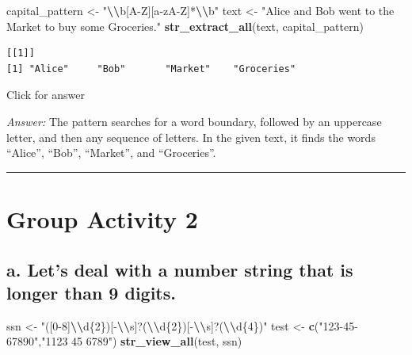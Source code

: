 \documentclass[
]{book}
\newenvironment{Shaded}{\begin{snugshade}}{\end{snugshade}}
\newcommand{\FunctionTok}[1]{\textcolor[rgb]{0.13,0.29,0.53}{\textbf{#1}}}
\newcommand{\NormalTok}[1]{#1}
\newcommand{\OtherTok}[1]{\textcolor[rgb]{0.56,0.35,0.01}{#1}}
\newcommand{\SpecialCharTok}[1]{\textcolor[rgb]{0.81,0.36,0.00}{\textbf{#1}}}
\newcommand{\StringTok}[1]{\textcolor[rgb]{0.31,0.60,0.02}{#1}}
\begin{document}
\begin{Shaded}
\begin{Highlighting}[]
\NormalTok{capital\_pattern }\OtherTok{\textless{}{-}} \StringTok{"}\SpecialCharTok{\textbackslash{}\textbackslash{}}\StringTok{b[A{-}Z][a{-}zA{-}Z]*}\SpecialCharTok{\textbackslash{}\textbackslash{}}\StringTok{b"}
\NormalTok{text }\OtherTok{\textless{}{-}} \StringTok{"Alice and Bob went to the Market to buy some Groceries."}
\FunctionTok{str\_extract\_all}\NormalTok{(text, capital\_pattern)}
\end{Highlighting}
\end{Shaded}

\begin{verbatim}
[[1]]
[1] "Alice"     "Bob"       "Market"    "Groceries"
\end{verbatim}

Click for answer

\emph{Answer:} The pattern searches for a word boundary, followed by an uppercase letter, and then any sequence of letters. In the given text, it finds the words ``Alice'', ``Bob'', ``Market'', and ``Groceries''.

\begin{center}\rule{0.5\linewidth}{0.5pt}\end{center}

\hypertarget{group-activity-2}{%
\section{Group Activity 2}\label{group-activity-2}}

\hypertarget{a.-lets-deal-with-a-number-string-that-is-longer-than-9-digits.}{%
\subsection{a. Let's deal with a number string that is longer than 9 digits.}\label{a.-lets-deal-with-a-number-string-that-is-longer-than-9-digits.}}

\begin{Shaded}
\begin{Highlighting}[]
\NormalTok{ssn }\OtherTok{\textless{}{-}} \StringTok{"([0{-}8]}\SpecialCharTok{\textbackslash{}\textbackslash{}}\StringTok{d\{2\})[{-}}\SpecialCharTok{\textbackslash{}\textbackslash{}}\StringTok{s]?(}\SpecialCharTok{\textbackslash{}\textbackslash{}}\StringTok{d\{2\})[{-}}\SpecialCharTok{\textbackslash{}\textbackslash{}}\StringTok{s]?(}\SpecialCharTok{\textbackslash{}\textbackslash{}}\StringTok{d\{4\})"}
\NormalTok{test }\OtherTok{\textless{}{-}} \FunctionTok{c}\NormalTok{(}\StringTok{"123{-}45{-}67890"}\NormalTok{,}\StringTok{"1123 45 6789"}\NormalTok{)}
\FunctionTok{str\_view\_all}\NormalTok{(test, ssn)}
\end{Highlighting}
\end{Shaded}
\end{document}
